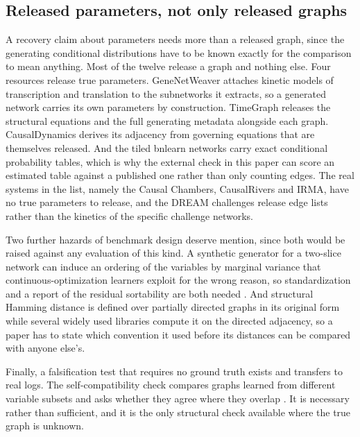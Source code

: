 \subsection{Released parameters, not only released graphs}
\label{sec:related_parameters}

A recovery claim about parameters needs more than a released graph, since the
generating conditional distributions have to be known exactly for the comparison
to mean anything. Most of the twelve release a graph and nothing else. Four
resources release true parameters. GeneNetWeaver attaches kinetic models of
transcription and translation to the subnetworks it extracts, so a generated
network carries its own parameters by construction. TimeGraph releases the
structural equations and the full generating metadata alongside each graph.
CausalDynamics derives its adjacency from governing equations that are themselves
released. And the tiled bnlearn networks carry exact conditional probability
tables, which is why the external check in this paper can score an estimated
table against a published one rather than only counting edges. The real systems
in the list, namely the Causal Chambers, CausalRivers and IRMA, have no true
parameters to release, and the DREAM challenges release edge lists rather than
the kinetics of the specific challenge networks.

Two further hazards of benchmark design deserve mention, since both would be
raised against any evaluation of this kind. A synthetic generator for a two-slice
network can induce an ordering of the variables by marginal variance that
continuous-optimization learners exploit for the wrong reason, so standardization
and a report of the residual sortability are both needed
\citep{reisach2021varsortability}. And structural Hamming distance is defined
over partially directed graphs in its original form \citep{tsamardinos2006max}
while several widely used libraries compute it on the directed adjacency, so a
paper has to state which convention it used before its distances can be compared
with anyone else's.

Finally, a falsification test that requires no ground truth exists and transfers
to real logs. The self-compatibility check compares graphs learned from different
variable subsets and asks whether they agree where they overlap
\citep{faller2024selfcompatibility}. It is necessary rather than sufficient, and
it is the only structural check available where the true graph is unknown.

